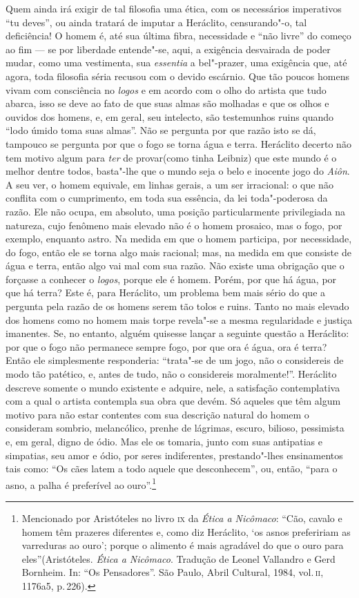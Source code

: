 Quem ainda irá exigir de tal filosofia uma ética, com os necessários
imperativos ``tu deves'', ou ainda tratará de imputar a Heráclito,
censurando"-o, tal deficiência! O homem é, até sua última fibra, necessidade
e ``não livre'' do começo ao fim --- se por liberdade entende"-se, aqui, a
exigência desvairada de poder mudar, como uma vestimenta, sua \textit{essentia} 
a bel"-prazer, uma exigência que, até agora, toda filosofia séria recusou com 
o devido escárnio. Que tão poucos homens vivam com consciência no \textit{logos} 
e em acordo com o olho do artista que tudo abarca, isso se deve ao fato de que 
suas almas são molhadas e que os olhos e ouvidos dos homens, e, em geral, 
seu intelecto, são testemunhos ruins quando ``lodo úmido toma suas almas''. 
Não se pergunta por que razão isto se dá, tampouco se pergunta por que o fogo 
se torna água e terra. Heráclito decerto não tem motivo algum para \textit{ter} 
de provar(como tinha Leibniz) que este mundo é o melhor dentre todos, basta"-lhe 
que o mundo seja o belo e inocente jogo do \textit{Aiôn}. A seu ver, o homem equivale, 
em linhas gerais, a um ser irracional: o que não conflita com o cumprimento, em toda 
sua essência, da lei toda"-poderosa da razão. Ele não ocupa, em absoluto, uma posição
particularmente privilegiada na natureza, cujo fenômeno mais elevado não é o
homem prosaico, mas o fogo, por exemplo, enquanto astro. Na medida em que o
homem participa, por necessidade, do fogo, então ele se torna algo mais
racional; mas, na medida em que consiste de água e terra, então algo vai mal
com sua razão. Não existe uma obrigação que o forçasse a conhecer o \textit{logos}, 
porque ele é homem. Porém, por que há água, por que há terra? Este é, para Heráclito, 
um problema bem mais sério do que a pergunta pela razão de
os homens serem tão tolos e ruins. Tanto no mais elevado dos homens como no
homem mais torpe revela"-se a mesma regularidade e justiça imanentes. Se, no
entanto, alguém quisesse lançar a seguinte questão a Heráclito: por que o
fogo não permanece sempre fogo, por que ora é água, ora é terra? Então ele
simplesmente responderia: ``trata"-se de um jogo, não o considereis de modo
tão patético, e, antes de tudo, não o considereis moralmente!''. Heráclito
descreve somente o mundo existente e adquire, nele, a satisfação
contemplativa com a qual o artista contempla sua obra que devém. Só aqueles
que têm algum motivo para não estar contentes com sua descrição natural do
homem o consideram sombrio, melancólico, prenhe de lágrimas, escuro, bilioso,
pessimista e, em geral, digno de ódio. Mas ele os tomaria, junto com suas
antipatias e simpatias, seu amor e ódio, por seres indiferentes,
prestando"-lhes ensinamentos tais como: ``Os cães latem a todo aquele que
desconhecem'', ou, então, ``para o asno, a palha é preferível ao
ouro''.\footnote{Mencionado por Aristóteles no livro \textsc{ix} da \textit{Ética 
a Nicômaco}: ``Cão, cavalo e homem têm prazeres diferentes e, como diz
Heráclito, `os asnos prefeririam as varreduras ao ouro'; porque o alimento é
mais agradável do que o ouro para eles''(Aristóteles. \textit{Ética a
Nicômaco}. Tradução de Leonel Vallandro e Gerd Bornheim. In: ``Os
Pensadores''. São Paulo, Abril Cultural, 1984, vol.\,\textsc{ii}, 1176a5,
p.\,226).}

